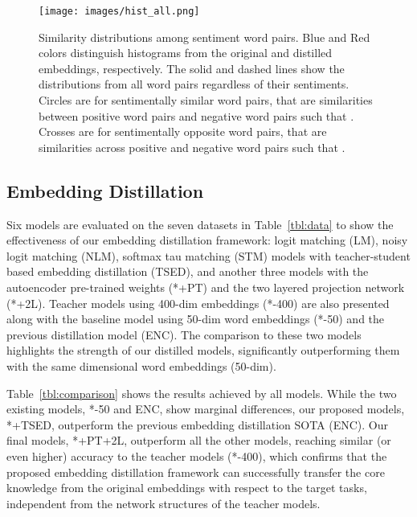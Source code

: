 \documentclass{article}
\begin{document}
\begin{figure}[hbt!]
	\centering
\texttt{[image: images/hist\_all.png]}
	\caption{Similarity distributions among sentiment word pairs. 
		Blue and Red colors distinguish histograms from the original and distilled embeddings, respectively.
		The solid and dashed lines show the distributions from all word pairs regardless of their sentiments.
		Circles are for sentimentally similar word pairs, that are similarities between positive word pairs and negative word pairs such that . Crosses are for sentimentally opposite word pairs, that are similarities across positive and negative word pairs such that .
	}
	\label{fig:lexicon}
	\vspace{-1ex}
\end{figure}







\subsection{Embedding Distillation}

Six models are evaluated on the seven datasets in Table~\ref{tbl:data} to show the effectiveness of our embedding distillation framework:
logit matching (LM), noisy logit matching (NLM), softmax tau matching (STM) models with teacher-student based embedding distillation (TSED), and another three models with the autoencoder pre-trained weights (*+PT) and the two layered projection network (*+2L).
Teacher models using 400-dim embeddings (*-400) are also presented along with the baseline model using 50-dim word embeddings (*-50) and the previous distillation model (ENC).
The comparison to these two models highlights the strength of our distilled models, significantly outperforming them with the same dimensional word embeddings (50-dim).

Table~\ref{tbl:comparison} shows the results achieved by all models.
While the two existing models, *-50 and ENC, show marginal differences, our proposed models, *+TSED, outperform the previous embedding distillation SOTA (ENC).
Our final models, *+PT+2L, outperform all the other models, reaching similar (or even higher) accuracy to the teacher models (*-400), which confirms that the proposed embedding distillation framework can successfully transfer the core knowledge from the original embeddings with respect to the target tasks, independent from the network structures of the teacher models.
\end{document}
